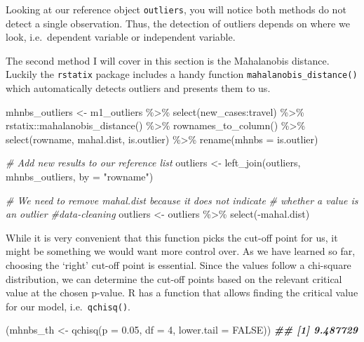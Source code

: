 \documentclass[
]{book}
\newenvironment{Shaded}{\begin{snugshade}}{\end{snugshade}}
\newcommand{\AttributeTok}[1]{\textcolor[rgb]{0.77,0.63,0.00}{#1}}
\newcommand{\CommentTok}[1]{\textcolor[rgb]{0.56,0.35,0.01}{\textit{#1}}}
\newcommand{\ConstantTok}[1]{\textcolor[rgb]{0.00,0.00,0.00}{#1}}
\newcommand{\DecValTok}[1]{\textcolor[rgb]{0.00,0.00,0.81}{#1}}
\newcommand{\DocumentationTok}[1]{\textcolor[rgb]{0.56,0.35,0.01}{\textbf{\textit{#1}}}}
\newcommand{\FloatTok}[1]{\textcolor[rgb]{0.00,0.00,0.81}{#1}}
\newcommand{\FunctionTok}[1]{\textcolor[rgb]{0.00,0.00,0.00}{#1}}
\newcommand{\NormalTok}[1]{#1}
\newcommand{\OtherTok}[1]{\textcolor[rgb]{0.56,0.35,0.01}{#1}}
\newcommand{\SpecialCharTok}[1]{\textcolor[rgb]{0.00,0.00,0.00}{#1}}
\newcommand{\StringTok}[1]{\textcolor[rgb]{0.31,0.60,0.02}{#1}}
\begin{document}
Looking at our reference object \texttt{outliers}, you will notice both methods do not detect a single observation. Thus, the detection of outliers depends on where we look, i.e.~dependent variable or independent variable.

The second method I will cover in this section is the Mahalanobis distance. Luckily the \texttt{rstatix} package includes a handy function \texttt{mahalanobis\_distance()} which automatically detects outliers and presents them to us.

\begin{Shaded}
\begin{Highlighting}[]
\NormalTok{mhnbs\_outliers }\OtherTok{\textless{}{-}}\NormalTok{ m1\_outliers }\SpecialCharTok{\%\textgreater{}\%}
  \FunctionTok{select}\NormalTok{(new\_cases}\SpecialCharTok{:}\NormalTok{travel) }\SpecialCharTok{\%\textgreater{}\%}
\NormalTok{  rstatix}\SpecialCharTok{::}\FunctionTok{mahalanobis\_distance}\NormalTok{() }\SpecialCharTok{\%\textgreater{}\%} 
  \FunctionTok{rownames\_to\_column}\NormalTok{() }\SpecialCharTok{\%\textgreater{}\%}
  \FunctionTok{select}\NormalTok{(rowname, mahal.dist, is.outlier) }\SpecialCharTok{\%\textgreater{}\%}
  \FunctionTok{rename}\NormalTok{(}\AttributeTok{mhnbs =}\NormalTok{ is.outlier)}

\CommentTok{\# Add new results to our reference list}
\NormalTok{outliers }\OtherTok{\textless{}{-}} \FunctionTok{left\_join}\NormalTok{(outliers, mhnbs\_outliers, }\AttributeTok{by =} \StringTok{"rowname"}\NormalTok{)}

\CommentTok{\# We need to remove mahal.dist because it does not indicate}
\CommentTok{\# whether a value is an outlier \#data{-}cleaning}
\NormalTok{outliers }\OtherTok{\textless{}{-}}\NormalTok{ outliers }\SpecialCharTok{\%\textgreater{}\%} \FunctionTok{select}\NormalTok{(}\SpecialCharTok{{-}}\NormalTok{mahal.dist)}
\end{Highlighting}
\end{Shaded}

While it is very convenient that this function picks the cut-off point for us, it might be something we would want more control over. As we have learned so far, choosing the `right' cut-off point is essential. Since the values follow a chi-square distribution, we can determine the cut-off points based on the relevant critical value at the chosen p-value. R has a function that allows finding the critical value for our model, i.e.~\texttt{qchisq()}.

\begin{Shaded}
\begin{Highlighting}[]
\NormalTok{(mhnbs\_th }\OtherTok{\textless{}{-}} \FunctionTok{qchisq}\NormalTok{(}\AttributeTok{p =} \FloatTok{0.05}\NormalTok{,}
                   \AttributeTok{df =} \DecValTok{4}\NormalTok{,}
                   \AttributeTok{lower.tail =} \ConstantTok{FALSE}\NormalTok{))}
\DocumentationTok{\#\# [1] 9.487729}
\end{Highlighting}
\end{Shaded}
\end{document}
